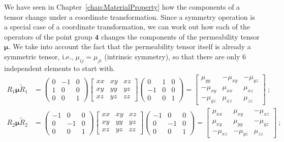 We have seen in Chapter~\ref{chap:MaterialProperty} how the components of a tensor change under a coordinate transformation. Since a symmetry operation is a special case of a coordinate transformation, we can work out how each of the operators of the point group $\textbf{4}$ changes the components of the permeability tensor $\bm{\mu}$.  We take into account the fact that the permeability tensor itself is already a symmetric tensor, i.e., $\mu_{ij}=\mu_{ji}$ (intrinsic symmetry), so that there are only $6$ independent elements to start with.
{\small\begin{align*}
	R_1\bm{\mu}\tilde{R}_1 &= \begin{pmatrix}0&-1&0\\ 1&0&0\\ 0&0&1\end{pmatrix}
	\begin{bmatrix}xx&xy&xz\\ xy&yy&yz\\ xz&yz&zz\end{bmatrix}\begin{pmatrix}0&1&0\\ -1&0&0\\ 0&0&1\end{pmatrix} = 
	\left[\begin{array}{ccc} 
	 \mu_{yy} & -\mu_{xy} & -\mu_{yz} \\ 
	-\mu_{xy} &  \mu_{xx} & \mu_{xz} \\ 
	-\mu_{yz} &  \mu_{xz} & \mu_{zz}\end{array}\right]\ ;\\
	R_2\bm{\mu}\tilde{R}_2 &= \begin{pmatrix}-1&0&0\\ 0&-1&0\\ 0&0&1\end{pmatrix}
	\begin{bmatrix}xx&xy&xz\\ xy&yy&yz\\ xz&yz&zz\end{bmatrix}\begin{pmatrix}-1&0&0\\ 0&-1&0\\ 0&0&1\end{pmatrix} = 
	\left[\begin{array}{ccc} 
	 \mu_{xx} & \mu_{xy} & -\mu_{xz} \\ 
	\mu_{xy} &  \mu_{yy} & -\mu_{yz} \\ 
	-\mu_{xz} &  -\mu_{yz} & \mu_{zz}\end{array}\right]\ ;\\

\end{align*}}
